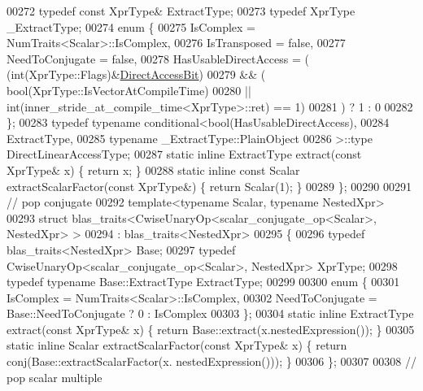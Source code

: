 \begin{DoxyCode}
00272   \textcolor{keyword}{typedef} \textcolor{keyword}{const} XprType& ExtractType;
00273   \textcolor{keyword}{typedef} XprType \_ExtractType;
00274   \textcolor{keyword}{enum} \{
00275     IsComplex = NumTraits<Scalar>::IsComplex,
00276     IsTransposed = \textcolor{keyword}{false},
00277     NeedToConjugate = \textcolor{keyword}{false},
00278     HasUsableDirectAccess = (    (int(XprType::Flags)&\hyperlink{group__flags_gabf1e9d0516a933445a4c307ad8f14915}{DirectAccessBit})
00279                               && (   \textcolor{keywordtype}{bool}(XprType::IsVectorAtCompileTime)
00280                                   || int(inner\_stride\_at\_compile\_time<XprType>::ret) == 1)
00281                              ) ?  1 : 0
00282   \};
00283   \textcolor{keyword}{typedef} \textcolor{keyword}{typename} conditional<bool(HasUsableDirectAccess),
00284     ExtractType,
00285     \textcolor{keyword}{typename} \_ExtractType::PlainObject
00286     >::type DirectLinearAccessType;
00287   \textcolor{keyword}{static} \textcolor{keyword}{inline} ExtractType extract(\textcolor{keyword}{const} XprType& x) \{ \textcolor{keywordflow}{return} x; \}
00288   \textcolor{keyword}{static} \textcolor{keyword}{inline} \textcolor{keyword}{const} Scalar extractScalarFactor(\textcolor{keyword}{const} XprType&) \{ \textcolor{keywordflow}{return} Scalar(1); \}
00289 \};
00290 
00291 \textcolor{comment}{// pop conjugate}
00292 \textcolor{keyword}{template}<\textcolor{keyword}{typename} Scalar, \textcolor{keyword}{typename} NestedXpr>
00293 \textcolor{keyword}{struct }blas\_traits<CwiseUnaryOp<scalar\_conjugate\_op<Scalar>, NestedXpr> >
00294  : blas\_traits<NestedXpr>
00295 \{
00296   \textcolor{keyword}{typedef} blas\_traits<NestedXpr> Base;
00297   \textcolor{keyword}{typedef} CwiseUnaryOp<scalar\_conjugate\_op<Scalar>, NestedXpr> XprType;
00298   \textcolor{keyword}{typedef} \textcolor{keyword}{typename} Base::ExtractType ExtractType;
00299 
00300   \textcolor{keyword}{enum} \{
00301     IsComplex = NumTraits<Scalar>::IsComplex,
00302     NeedToConjugate = Base::NeedToConjugate ? 0 : IsComplex
00303   \};
00304   \textcolor{keyword}{static} \textcolor{keyword}{inline} ExtractType extract(\textcolor{keyword}{const} XprType& x) \{ \textcolor{keywordflow}{return} Base::extract(x.nestedExpression()); \}
00305   \textcolor{keyword}{static} \textcolor{keyword}{inline} Scalar extractScalarFactor(\textcolor{keyword}{const} XprType& x) \{ \textcolor{keywordflow}{return} conj(Base::extractScalarFactor(x.
      nestedExpression())); \}
00306 \};
00307 
00308 \textcolor{comment}{// pop scalar multiple}

\end{DoxyCode}
